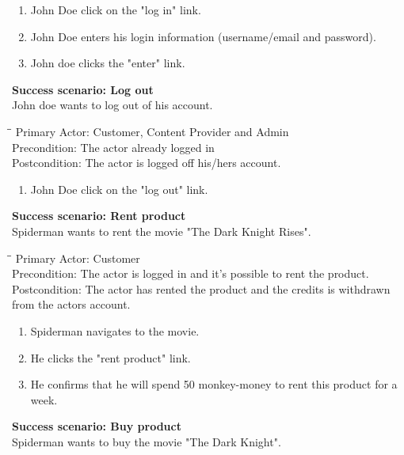 \begin{enumerate} \setlength{\itemsep}{-1mm}
	\item John Doe click on the "log in" link.
	\item John Doe enters his login information (username/email and password).
	\item John doe clicks the "enter" link.
\end{enumerate}
\vspace{3mm}
\textbf{Success scenario: Log out} \\
John doe wants to log out of his account. 
\begin{tabbing}
\hspace{5mm}\=\hspace{26mm}\=\kill
\>Primary Actor:\> Customer, Content Provider and Admin\\
\>Precondition:\> The actor already logged in\\
\>Postcondition:\> The actor is logged off his/hers account.
\end{tabbing}
\begin{enumerate} \setlength{\itemsep}{-1mm}
	\item John Doe click on the "log out" link.
\end{enumerate}
\vspace{3mm}
\textbf{Success scenario: Rent product} \\
Spiderman wants to rent the movie "The Dark Knight Rises". 
\begin{tabbing}
\hspace{5mm}\=\hspace{26mm}\=\kill
\>Primary Actor:\> Customer\\
\>Precondition:\> The actor is logged in and it's possible to rent the product.\\
\>Postcondition:\> The actor has rented the product and the credits is withdrawn from the actors account.
\end{tabbing}
\begin{enumerate} \setlength{\itemsep}{-1mm}
	\item Spiderman navigates to the movie.
	\item He clicks the "rent product" link.
	\item He confirms that he will spend 50 monkey-money to rent this product for a week.
\end{enumerate}
\vspace{3mm}
\textbf{Success scenario: Buy product} \\
Spiderman wants to buy the movie "The Dark Knight". 
